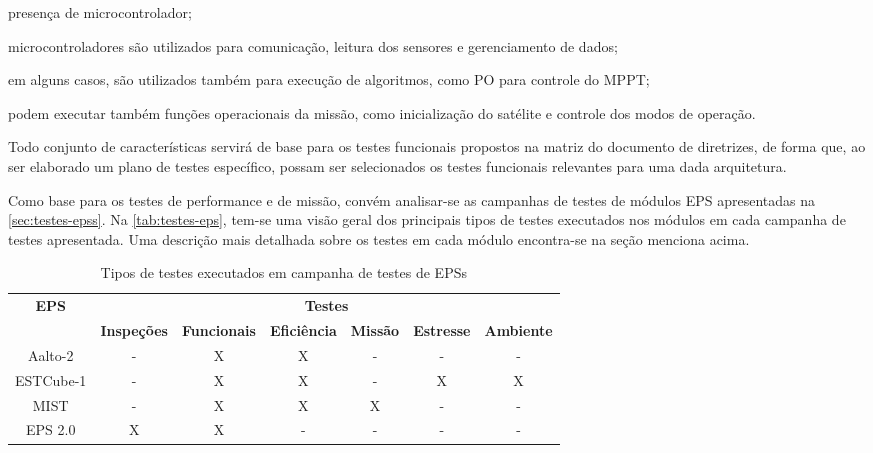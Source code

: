 \begin{alineas}
    \item presença de microcontrolador;
    \begin{alineas}
        \item microcontroladores são utilizados para comunicação, leitura dos sensores e gerenciamento de dados;
        \item em alguns casos, são utilizados também para execução de algoritmos, como \gls{PO} para controle do \gls{MPPT};
        \item podem executar também funções operacionais da missão, como inicialização do satélite e controle dos modos de operação.
    \end{alineas}
\end{alineas}

Todo conjunto de características servirá de base para os testes funcionais propostos na matriz do documento de diretrizes, de forma que, ao ser elaborado um plano de testes específico, possam ser selecionados os testes funcionais relevantes para uma dada arquitetura.

Como base para os testes de performance e de missão, convém analisar-se as campanhas de testes de módulos \gls{EPS} apresentadas na \autoref{sec:testes-epss}.
Na \autoref{tab:testes-eps}, tem-se uma visão geral dos principais tipos de testes executados nos módulos em cada campanha de testes apresentada.
Uma descrição mais detalhada sobre os testes em cada módulo encontra-se na seção menciona acima.

\begin{table}[ht!]
    \ABNTEXfontereduzida
    \centering
    \caption{Tipos de testes executados em campanha de testes de EPSs}
    \begin{tabular}{ccccccc}
        \toprule
        \multirow{2}{*}{\textbf{EPS}} & \multicolumn{6}{c}{\textbf{Testes}} \\
        \cline{2-7}
        & \textbf{Inspeções} & \textbf{Funcionais} & \textbf{Eficiência} & \textbf{Missão} & \textbf{Estresse} & \textbf{Ambiente} \\
        \midrule
        \midrule
        Aalto-2   & - & X & X & - & - & - \\
        ESTCube-1 & - & X & X & - & X & X \\
        MIST      & - & X & X & X & - & - \\
        EPS 2.0   & X & X & - & - & - & - \\
        \bottomrule
    \end{tabular}
    \label{tab:testes-eps}
\end{table}


